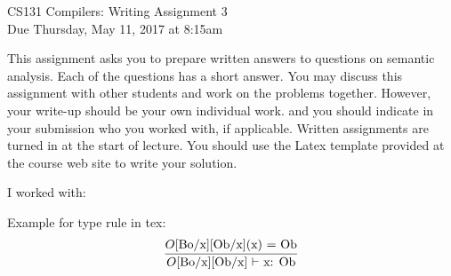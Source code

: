 \documentclass[10pt]{article}
\newcommand{\infertext}[2]{\infer{{\textrm{#1}}}{#2}}
\begin{document}
\begin{center}
\Large CS131 Compilers: Writing Assignment 3\\Due Thursday, May 11, 2017 at 8:15am
\end{center}

\begin{center}
\LARGE
\end{center}

This assignment asks you to prepare written answers to questions on
semantic analysis. Each of the questions has a short answer. You
may discuss this assignment with other students and work on the problems
together. However, your write-up should be your own individual work.
and you should indicate in your submission who you worked with, if applicable.
Written assignments are turned in at the start of lecture.
You should use the Latex template provided at the course web site to write your solution.

\begin{center}
I worked with:
\end{center}

Example for type rule in tex:
\[\infertext
          {$O$[Bo/x][Ob/x] $\vdash$ x: Ob}
          {\textrm{$O$[Bo/x][Ob/x](x) = Ob}}       
\]
\end{document}

